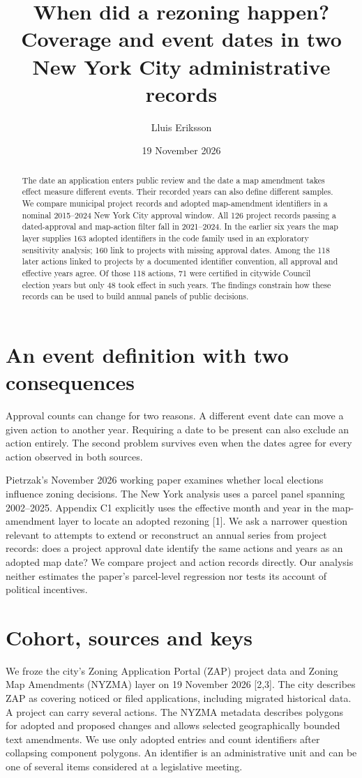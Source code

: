 \documentclass[11pt]{article}
\title{When did a rezoning happen?\\[3pt]\large Coverage and event dates in two New York City administrative records}
\author{Lluis Eriksson}
\date{19 November 2026}
\begin{document}
\maketitle
\begin{abstract}
The date an application enters public review and the date a map amendment takes effect measure different events. Their recorded years can also define different samples. We compare municipal project records and adopted map-amendment identifiers in a nominal 2015--2024 New York City approval window. All 126 project records passing a dated-approval and map-action filter fall in 2021--2024. In the earlier six years the map layer supplies 163 adopted identifiers in the code family used in an exploratory sensitivity analysis; 160 link to projects with missing approval dates. Among the 118 later actions linked to projects by a documented identifier convention, all approval and effective years agree. Of those 118 actions, 71 were certified in citywide Council election years but only 48 took effect in such years. The findings constrain how these records can be used to build annual panels of public decisions.
\end{abstract}
\section{An event definition with two consequences}
Approval counts can change for two reasons. A different event date can move a given action to another year. Requiring a date to be present can also exclude an action entirely. The second problem survives even when the dates agree for every action observed in both sources.

Pietrzak's November 2026 working paper examines whether local elections influence zoning decisions. The New York analysis uses a parcel panel spanning 2002--2025. Appendix C1 explicitly uses the effective month and year in the map-amendment layer to locate an adopted rezoning [1]. We ask a narrower question relevant to attempts to extend or reconstruct an annual series from project records: does a project approval date identify the same actions and years as an adopted map date? We compare project and action records directly. Our analysis neither estimates the paper's parcel-level regression nor tests its account of political incentives.

\section{Cohort, sources and keys}
We froze the city's Zoning Application Portal (ZAP) project data and Zoning Map Amendments (NYZMA) layer on 19 November 2026 [2,3]. The city describes ZAP as covering noticed or filed applications, including migrated historical data. A project can carry several actions. The NYZMA metadata describes polygons for adopted and proposed changes and allows selected geographically bounded text amendments. We use only adopted entries and count identifiers after collapsing component polygons. An identifier is an administrative unit and can be one of several items considered at a legislative meeting.
\end{document}
